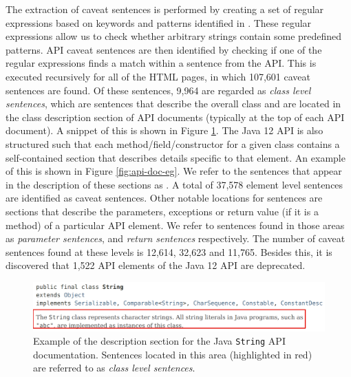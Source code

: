 The extraction of caveat sentences is performed by creating a set of regular expressions based on keywords and patterns identified in \cite{caveat-knowledge-graph}. These regular expressions allow us to check whether arbitrary strings contain some predefined patterns. API caveat sentences are then identified by checking if one of the regular expressions finds a match within a sentence from the API. This is executed recursively for all of the HTML pages, in which 107,601 caveat sentences are found. Of these sentences, 9,964 are regarded as \textit{class level sentences}, which are sentences that describe the overall class and are located in the class description section of API documents (typically at the top of each API document). A snippet of this is shown in Figure \ref{fig:class-sents}. The Java 12 API is also structured such that each method/field/constructor for a given class contains a self-contained section that describes details specific to that element. An example of this is shown in Figure \ref{fig:api-doc-eg}. We refer to the sentences that appear in the description of these sections as . A total of 37,578 element level sentences are identified as caveat sentences. Other notable locations for sentences are sections that describe the parameters, exceptions or return value (if it is a method) of a particular API element. We refer to sentences found in those areas as \textit{parameter sentences},  and \textit{return sentences} respectively. The number of caveat sentences found at these levels is 12,614, 32,623 and 11,765. Besides this, it is discovered that 1,522 API elements of the Java 12 API are deprecated. \\

\begin{figure}[h]
	\label{fig:class-sents}
	\centering
	\includegraphics[width=\textwidth]{figs/class-sents-highlight.png}
	\caption{Example of the description section for the Java \lstinline{String} API documentation. Sentences located in this area (highlighted in red) are referred to as \textit{class level sentences}.}
\end{figure}

